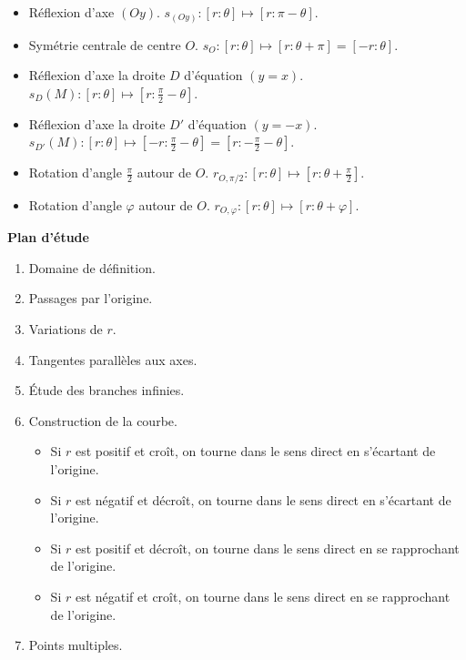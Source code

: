 \documentclass[10pt,class=article,crop=false]{standalone}
\begin{document}
\begin{multicols}{2}
\begin{itemize}
	\item Réflexion d'axe $(Oy)$. $s_{(Oy)} : [r:\theta] \mapsto [r:\pi-\theta]$.
	
	\item Symétrie centrale de centre $O$. $s_O : [r:\theta] \mapsto [r:\theta+\pi]=[-r:\theta]$.
	
	\item Réflexion d'axe la droite $D$ d'équation $(y=x)$.
	$s_D(M) : [r:\theta] \mapsto [r:\frac{\pi}{2}-\theta]$.
	
	\item Réflexion d'axe la droite $D'$ d'équation $(y=-x)$.
	$s_{D'}(M) : [r:\theta] \mapsto [-r:\frac{\pi}{2}-\theta]=[r:-\frac{\pi}{2}-\theta]$.
	
	\item Rotation d'angle $\frac{\pi}{2}$ autour de $O$.
	$r_{O,\pi/2} : [r:\theta] \mapsto [r:\theta+\frac{\pi}{2}]$.
	
	\item Rotation d'angle $\varphi$ autour de $O$.
	$r_{O,\varphi} : [r:\theta] \mapsto [r:\theta+\varphi]$.
\end{itemize}

\medskip 

\textbf{Plan d'étude}
\begin{enumerate}
	\item Domaine de définition.
	
	\item Passages par l'origine. 
	
	\item Variations de $r$. 
	
	\item Tangentes parallèles aux axes.
	
	\item Étude des branches infinies.
	
	\item Construction de la courbe.
	\begin{itemize}
		\item Si $r$ est positif et croît, on tourne dans le sens direct en s'écartant de l'origine.
		\item Si $r$ est négatif et décroît, on tourne dans le sens direct en s'écartant de l'origine.
		\item Si $r$ est positif et décroît, on tourne dans le sens direct en se rapprochant de l'origine.
		\item Si $r$ est négatif et croît, on tourne dans le sens direct en se rapprochant de l'origine.
	\end{itemize}
	\item Points multiples.
	
\end{enumerate}







\end{multicols}
\end{document}
